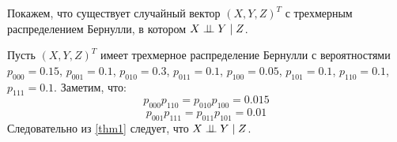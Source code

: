 Покажем, что существует случайный вектор $(X,Y,Z)^T$ с трехмерным распределением Бернулли, в котором $X \perp\!\!\!\perp Y \mid Z$.
\begin{example}
    Пусть $(X,Y,Z)^T$ имеет трехмерное распределение Бернулли с вероятностями
    $p_{000}=0.15$, $p_{001}=0.1$, $p_{010}=0.3$, $p_{011}=0.1$, $p_{100}=0.05$, $p_{101}=0.1$,
    $p_{110}=0.1$, $p_{111}=0.1$.
    Заметим, что:
    $$p_{000}p_{110}=p_{010}p_{100}=0.015$$ $$p_{001}p_{111}=p_{011}p_{101}=0.01$$
    Следовательно из \autoref{thm1} следует, что $X \perp\!\!\!\perp Y \mid Z$.
\end{example}
